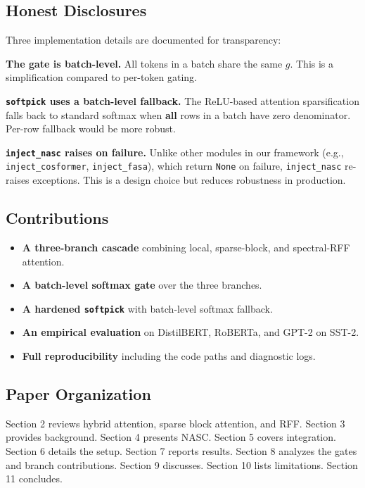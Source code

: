 \subsection{Honest Disclosures}

Three implementation details are documented for transparency:

\textbf{The gate is batch-level.} All tokens in a batch share the same $g$. 
This is a simplification compared to per-token gating.

\textbf{\texttt{softpick} uses a batch-level fallback.} The ReLU-based attention 
sparsification falls back to standard softmax when \textbf{all} rows in a 
batch have zero denominator. Per-row fallback would be more robust.

\textbf{\texttt{inject\_nasc} raises on failure.} Unlike other modules in our framework 
(e.g., \texttt{inject\_cosformer}, \texttt{inject\_fasa}), which return \texttt{None} on failure, 
\texttt{inject\_nasc} re-raises exceptions. This is a design choice but reduces 
robustness in production.

\subsection{Contributions}

\begin{itemize}
\item \textbf{A three-branch cascade} combining local, sparse-block, and spectral-RFF
  attention.
\item \textbf{A batch-level softmax gate} over the three branches.
\item \textbf{A hardened \texttt{softpick}} with batch-level softmax fallback.
\item \textbf{An empirical evaluation} on DistilBERT, RoBERTa, and GPT-2 on SST-2.
\item \textbf{Full reproducibility} including the code paths and diagnostic logs.

\end{itemize}
\subsection{Paper Organization}

Section 2 reviews hybrid attention, sparse block attention, and RFF. 
Section 3 provides background. Section 4 presents NASC. Section 5 covers 
integration. Section 6 details the setup. Section 7 reports results. 
Section 8 analyzes the gates and branch contributions. Section 9 discusses. 
Section 10 lists limitations. Section 11 concludes.



